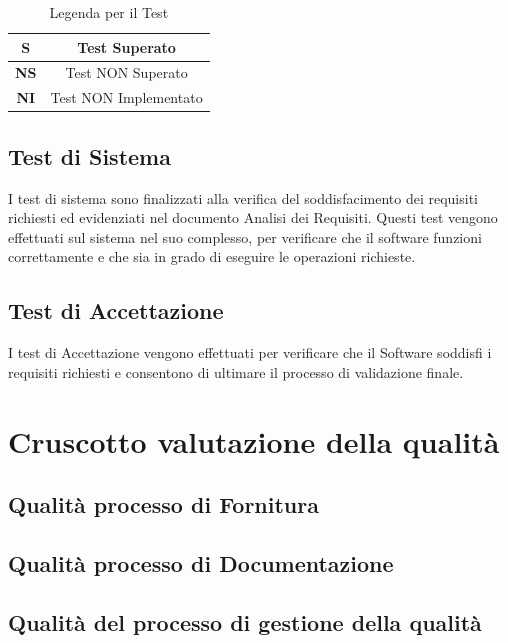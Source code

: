 \documentclass{article}
\begin{document}
\begin{table}[H]
    \centering
    \renewcommand{\arraystretch}{1.5}
\begin{tabular}{|c|c|}
    \hline
    \textbf{S} & Test Superato \\
    \hline
    \textbf{NS} & Test NON Superato \\
    \hline
    \textbf{NI} & Test NON Implementato \\
    \hline
\end{tabular}
\caption{Legenda per il Test}
\end{table}


\subsection{Test di Sistema} %
I test di sistema sono finalizzati alla verifica del soddisfacimento dei requisiti richiesti ed evidenziati nel documento
Analisi dei Requisiti. Questi test vengono effettuati sul sistema nel suo complesso, per verificare che il software funzioni correttamente
e che sia in grado di eseguire le operazioni richieste.

\subsection{Test di Accettazione} %
I test di Accettazione vengono effettuati per verificare che il Software soddisfi i requisiti richiesti e consentono di ultimare il processo di validazione finale.

\section{Cruscotto valutazione della qualità}


\subsection{Qualità processo di Fornitura}


\subsection{Qualità processo di Documentazione}


\subsection{Qualità del processo di gestione della qualità}
\end{document}
